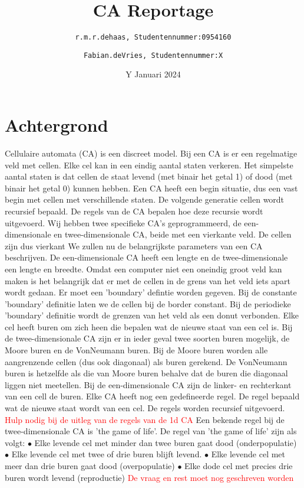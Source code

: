 \documentclass[12pt,a4paper]{article}
\title{CA Reportage}
\author{
\texttt{r.m.r.dehaas, \hspace{6pt} 
Studentennummer:\hspace{2pt}0954160}
\and
\texttt{Fabian.deVries, \hspace{6pt}
Studentennummer:\hspace{2pt}X}}
\date{Y Januari 2024}
\begin{document}
\maketitle
\section*{Achtergrond}
Cellulaire automata (CA) is een discreet model. 
Bij een CA is er een regelmatige veld met cellen. 
Elke cel kan in een eindig aantal staten verkeren.
Het simpelste aantal staten is dat cellen 
de staat levend (met binair het getal 1) of dood (met binair het getal 0) kunnen hebben.
Een CA heeft een begin situatie, dus een vast begin met cellen met verschillende staten.
De volgende generatie cellen wordt recursief bepaald. 
De regels van de CA bepalen hoe deze recursie wordt uitgevoerd.
Wij hebben twee specifieke CA's geprogrammeerd, de een-dimensionale en 
twee-dimensionale CA, beide met een vierkante veld. 
De cellen zijn dus vierkant  
We zullen nu de belangrijkste parameters van een CA beschrijven.
De een-dimensionale CA heeft een lengte en de twee-dimensionale een lengte en breedte.
Omdat een computer niet een oneindig groot veld kan maken is het belangrijk dat 
er met de cellen in de grens van het veld iets apart wordt gedaan. Er moet een 'boundary' defintie worden gegeven.
Bij de constante 'boundary' definitie laten we de cellen bij de border constant.
Bij de periodieke 'boundary' definitie wordt de grenzen van het veld als een donut verbonden.
Elke cel heeft buren om zich heen die bepalen wat de nieuwe staat van een cel is.
Bij de twee-dimensionale CA zijn er in ieder geval twee soorten buren mogelijk, de Moore buren en de VonNeumann buren.
Bij de Moore buren worden alle aangrenzende cellen (dus ook diagonaal) als buren gerekend.
De VonNeumann buren is hetzelfde als die van Moore buren behalve dat de buren die diagonaal liggen niet meetellen.
Bij de een-dimensionale CA zijn de linker- en rechterkant van een cell de buren.
Elke CA heeft nog een gedefineerde regel. De regel bepaald wat de nieuwe staat wordt van een cel.
De regels worden recursief uitgevoerd.
\textcolor{red}{Hulp nodig bij de uitleg van de regels van de 1d CA}
\newpage
Een bekende regel bij de twee-dimensionale CA is 'the game of life'. 
\newline
De regel van 'the game of life' zijn als volgt:
\vspace{4pt}
\newline
$\bullet$ Elke levende cel met minder dan twee buren gaat dood (onderpopulatie) 
\newline 
$\bullet$ Elke levende cel met twee of drie buren blijft levend.
\newline
$\bullet$ Elke levende cel met meer dan drie buren gaat dood (overpopulatie)
\newline 
$\bullet$ Elke dode cel met precies drie buren wordt levend (reproductie) 
\newline
\vspace{4pt}
\textcolor{red}{De vraag en rest moet nog geschreven worden}
\end{document}
